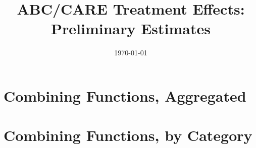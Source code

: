 
 

\title{ABC/CARE Treatment Effects: Preliminary Estimates} 

\date{\today} 

 

\maketitle 

\tableofcontents 

\clearpage 


\def\arraystretch{0.6}

\setlength\tabcolsep{0.3em}

\section{{Combining Functions, Aggregated}}


\begin{center}
	
\end{center}

\begin{center}
	
\end{center}

\begin{center}
	
\end{center}
\section{{Combining Functions, by Category}}


\begin{center}
	
\end{center}

\begin{center}
	
\end{center}

\begin{center}
	
\end{center}

\begin{center}
	
\end{center}

\begin{center}
	
\end{center}

